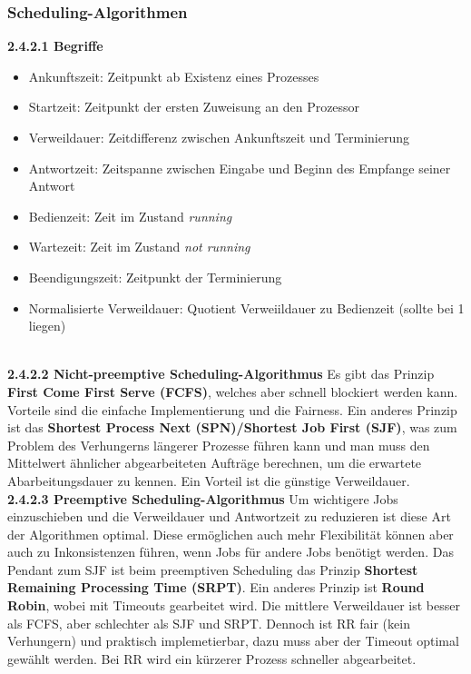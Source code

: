 \documentclass{article}
\begin{document}
\subsubsection{Scheduling-Algorithmen}
    \textbf{2.4.2.1 Begriffe}\newline
    \begin{itemize}
        \item Ankunftszeit: Zeitpunkt ab Existenz eines Prozesses
        \item Startzeit: Zeitpunkt der ersten Zuweisung an den Prozessor
        \item Verweildauer: Zeitdifferenz zwischen Ankunftszeit und Terminierung
        \item Antwortzeit: Zeitspanne zwischen Eingabe und Beginn des Empfange seiner Antwort
        \item Bedienzeit: Zeit im Zustand \textit{running} 
        \item Wartezeit: Zeit im Zustand \textit{not running}
        \item Beendigungszeit: Zeitpunkt der Terminierung
        \item Normalisierte Verweildauer: Quotient Verweiildauer zu Bedienzeit (sollte bei 1 liegen)
    \end{itemize}\newline
    \\
    \textbf{2.4.2.2 Nicht-preemptive Scheduling-Algorithmus}\newline
    Es gibt das Prinzip \textbf{First Come First Serve (FCFS)}, welches aber schnell blockiert werden kann. Vorteile sind die einfache Implementierung und die Fairness.\newline
    Ein anderes Prinzip ist das \textbf{Shortest Process Next (SPN)/Shortest Job First (SJF)}, was zum Problem des Verhungerns längerer Prozesse führen kann und man muss den Mittelwert ähnlicher abgearbeiteten Aufträge berechnen, um die erwartete Abarbeitungsdauer zu kennen. Ein Vorteil ist die günstige Verweildauer.\newline
    \\
    \textbf{2.4.2.3 Preemptive Scheduling-Algorithmus}\newline
    Um wichtigere Jobs einzuschieben und die Verweildauer und Antwortzeit zu reduzieren ist diese Art der Algorithmen optimal. Diese ermöglichen auch mehr Flexibilität können aber auch zu Inkonsistenzen führen, wenn Jobs für andere Jobs benötigt werden.\newline
    Das Pendant zum SJF ist beim preemptiven Scheduling das Prinzip \textbf{Shortest Remaining Processing Time (SRPT)}. Ein anderes Prinzip ist \textbf{Round Robin}, wobei mit Timeouts gearbeitet wird. Die mittlere Verweildauer ist besser als FCFS, aber schlechter als SJF und SRPT. Dennoch ist RR fair (kein Verhungern) und praktisch implemetierbar, dazu muss aber der Timeout optimal gewählt werden. Bei RR wird ein kürzerer Prozess schneller abgearbeitet.\newline
\end{document}
